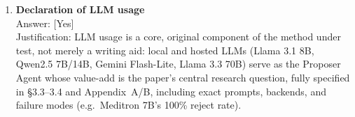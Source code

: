 \documentclass{article}
\begin{document}
\begin{enumerate}
\item \textbf{Declaration of LLM usage}\\
Answer: [Yes]\\
Justification: LLM usage is a core, original component of the method under test, not merely a
writing aid: local and hosted LLMs (Llama 3.1 8B, Qwen2.5 7B/14B, Gemini Flash-Lite, Llama 3.3 70B)
serve as the Proposer Agent whose value-add is the paper's central research question, fully
specified in \S3.3--3.4 and Appendix~A/B, including exact prompts, backends, and failure modes
(e.g.\ Meditron 7B's 100\% reject rate).

\end{enumerate}
\end{document}

